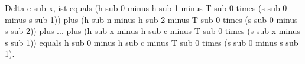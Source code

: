 Delta e sub x, ist equals (h sub 0 minus h sub 1 minus T sub 0 times (s sub 0 minus s sub 1)) plus (h sub n minus h sub 2 minus T sub 0 times (s sub 0 minus s sub 2)) plus ... plus (h sub x minus h sub c minus T sub 0 times (s sub x minus s sub 1)) equals h sub 0 minus h sub c minus T sub 0 times (s sub 0 minus s sub 1).